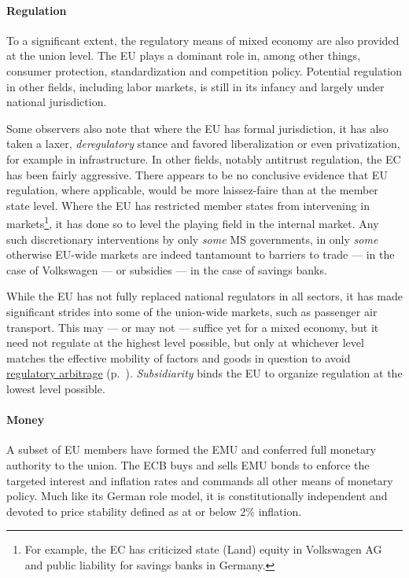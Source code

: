 \paragraph{Regulation} To a significant extent, the regulatory means of mixed economy are also provided at the union level. The \gls{EU} plays a dominant role in, among other things, consumer protection, standardization and competition policy. Potential regulation in other fields, including labor markets, is still in its infancy and largely under national jurisdiction. %

Some observers also note that where the \gls{EU} has formal jurisdiction, it has also taken a laxer, \emph{deregulatory} stance and favored liberalization or even privatization, for example in infrastructure. %
In other fields, notably antitrust regulation, the \gls{EC} has been fairly aggressive. There appears to be no conclusive evidence that \gls{EU} regulation, where applicable, would be more laissez-faire than at the member state level. %
Where the \gls{EU} has restricted member states from intervening in markets\footnote{
	For example, the \gls{EC} has criticized state (Land) equity in Volkswagen AG and public liability for savings banks in Germany.}, 
it has done so to level the playing field in the internal market. Any such discretionary interventions by only \emph{some} \gls{MS} governments, in only \emph{some} otherwise \gls{EU}-wide markets are indeed tantamount to barriers to trade --- in the case of Volkswagen --- or subsidies --- in the case of savings banks.  %

While the \gls{EU} has not fully replaced national regulators in all sectors, it has made significant strides into some of the union-wide markets, such as passenger air transport. This may --- or may not --- suffice yet for a mixed economy, but it need not regulate at the highest level possible, but only at whichever level matches the effective mobility of factors and goods in question to avoid \hyperref[sec:regulatory]{regulatory arbitrage} (p.~\pageref{sec:regulatory}). \emph{Subsidiarity} binds the \gls{EU} to organize regulation at the lowest level possible.

\paragraph{Money} A subset of \gls{EU} members have formed the \gls{EMU} and conferred full monetary authority to the union. The \gls{ECB} buys and sells \gls{EMU} bonds to enforce the targeted interest and inflation rates and commands all other means of monetary policy. Much like its German role model, it is constitutionally independent and devoted to price stability defined as at or below 2\% inflation.


